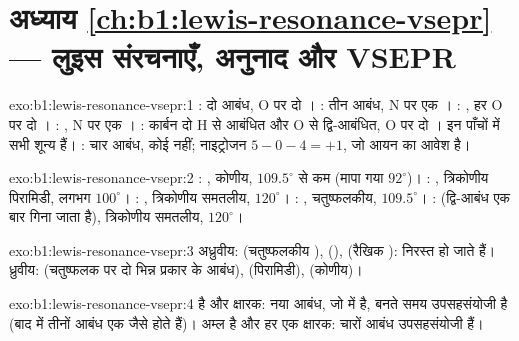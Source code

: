 \section*{अध्याय \ref{ch:b1:lewis-resonance-vsepr} --- लुइस संरचनाएँ, अनुनाद और VSEPR}

\begin{solution}{exo:b1:lewis-resonance-vsepr:1}
: दो  आबंध, O पर दो । : तीन
 आबंध, N पर एक । : , हर O पर दो । : , N पर एक । : कार्बन
दो H से आबंधित और O से द्वि-आबंधित, O पर दो । इन पाँचों में सभी  शून्य हैं। : चार  आबंध, कोई  नहीं; नाइट्रोजन $5 - 0 - 4 = +1$, जो आयन का आवेश है।
\end{solution}

\begin{solution}{exo:b1:lewis-resonance-vsepr:2}
: , कोणीय, $109.5^\circ$ से कम (मापा गया $92^\circ$)।
: , त्रिकोणीय पिरामिडी, लगभग $100^\circ$।
: , त्रिकोणीय समतलीय, $120^\circ$। : ,
चतुष्फलकीय, $109.5^\circ$। :  (द्वि-आबंध
एक बार गिना जाता है), त्रिकोणीय समतलीय, $120^\circ$।
\end{solution}

\begin{solution}{exo:b1:lewis-resonance-vsepr:3}
अध्रुवीय:  (चतुष्फलकीय ),  (),
 (रैखिक ):  निरस्त हो जाते हैं। ध्रुवीय: 
(चतुष्फलक पर दो भिन्न प्रकार के आबंध),  (पिरामिडी),
 (कोणीय)।
\end{solution}

\begin{solution}{exo:b1:lewis-resonance-vsepr:4}
  है और  क्षारक: नया  आबंध, जो
 में है, बनते समय उपसहसंयोजी है (बाद में तीनों  आबंध
एक जैसे होते हैं)।  अम्ल है और हर  एक क्षारक: चारों
 आबंध उपसहसंयोजी हैं।
\end{solution}

